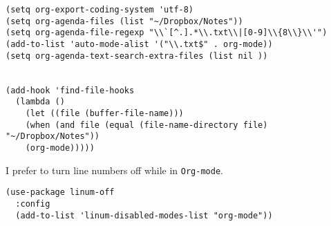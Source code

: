 \documentclass{article}
\begin{document}
\begin{verbatim}
(setq org-export-coding-system 'utf-8)
(setq org-agenda-files (list "~/Dropbox/Notes"))
(setq org-agenda-file-regexp "\\`[^.].*\\.txt\\|[0-9]\\{8\\}\\'")
(add-to-list 'auto-mode-alist '("\\.txt$" . org-mode))
(setq org-agenda-text-search-extra-files (list nil ))


(add-hook 'find-file-hooks 
  (lambda ()
    (let ((file (buffer-file-name)))
    (when (and file (equal (file-name-directory file) "~/Dropbox/Notes"))
    (org-mode)))))
\end{verbatim}

I prefer to turn line numbers off while in \texttt{Org-mode}.

\begin{verbatim}
(use-package linum-off
  :config
  (add-to-list 'linum-disabled-modes-list "org-mode"))
\end{verbatim}
\end{document}
